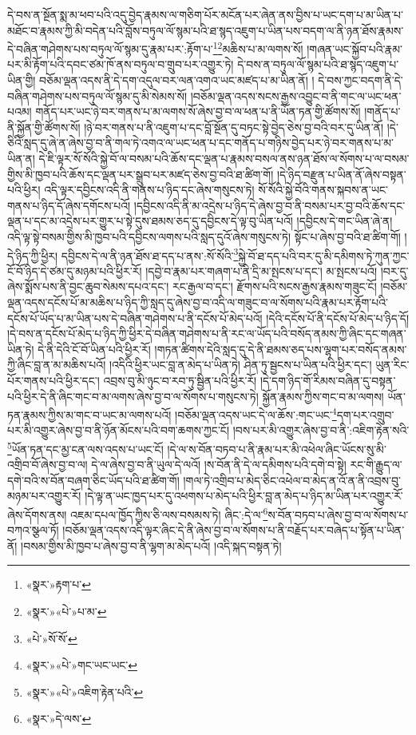དེ་བས་ན་སྔོན་སྨ་མ་ཕབ་པའི་འདུ་བྱེད་རྣམས་ལ་གཅིག་པོར་མངོན་པར་ཞེན་ནས་བྱིས་པ་ཡང་དག་པ་མ་ཡིན་པ་མཐོང་བ་རྣམས་ཀྱི་མི་བདེན་པའི་བློས་བཏུལ་ལོ་སྙམ་པའི་ཐ་སྙད་འཇུག་པ་ཡིན་པས་བདག་ལ་ནི་ཉན་ཐོས་རྣམས་དེ་བཞིན་གཤེགས་པས་བཏུལ་ལོ་སྙམ་དུ་རྣམ་པར་:རྟོག་པ་\footnote{«སྣར་»རྟག་པ་}\footnote{«སྣར་»«པེ་»པ་མ་}མཆིས་པ་མ་ལགས་སོ། །གཞན་ཡང་སྐྱོབ་པའི་རྣམ་པར་མི་རྟོག་པའི་དབང་ཙམ་ཁོ་ནས་བཏུལ་བ་གྲུབ་པར་འགྱུར་ཏེ། དེ་བས་ན་བཏུལ་ལོ་སྙམ་པའི་ཐ་སྙད་འཇུག་པ་ཡིན་གྱི། བཅོམ་ལྡན་འདས་ནི་དེ་དག་འདུལ་བར་ལན་འགའ་ཡང་མཛད་པ་མ་ཡིན་ནོ། །
དེ་བས་ཀྱང་བདག་ནི་དེ་བཞིན་གཤེགས་པས་བཏུལ་ལོ་སྙམ་དུ་མི་སེམས་སོ། །བཅོམ་ལྡན་འདས་སངས་རྒྱས་འབྱུང་བ་ནི་གང་ལ་ཡང་ཕན་པའམ། གནོད་པར་ཡང་ཉེ་བར་གནས་པ་མ་ལགས་སོ་ཞེས་བྱ་བ་ལ་ཕན་པ་ནི་ཡོན་ཏན་གྱི་ཚོགས་སོ། །གནོད་པ་ནི་སྐྱོན་གྱི་ཚོགས་སོ། །ཉེ་བར་གནས་པ་ནི་འཇུག་པ་དང་བློ་སྔོན་དུ་བཏང་སྟེ་བྱེད་ཅེས་བྱ་བའི་བར་དུ་ཡིན་ནོ། །དེ་ཅིའི་སླད་དུ་ཞེ་ན་ཞེས་བྱ་བ་ནི་གལ་ཏེ་འགའ་ལ་ཡང་ཕན་པ་དང་གནོད་པ་གཉིས་བྱེད་པར་ཉེ་བར་གནས་པ་མ་ཡིན་ན། དེ་ཇི་ལྟར་སོ་སོའི་སྐྱེ་བོ་ལ་བསམ་པའི་ཆོས་དང་ལྡན་པ་རྣམས་བསལ་ནས་ཉན་ཐོས་ལ་སོགས་པ་ལ་བསམ་གྱིས་མི་ཁྱབ་པའི་ཆོས་དང་ལྡན་པར་སྒྲུབ་པར་མཛད་ཅེས་བྱ་བའི་ཐ་ཚིག་གོ། །དེ་ཉིད་བརྫུན་པ་ཡིན་ནོ་ཞེས་བསྟན་པའི་ཕྱིར། འདི་ལྟར་དབྱིངས་འདི་ནི་གནས་པ་ཉིད་དང་ཞེས་གསུངས་ཏེ། སོ་སོའི་སྐྱེ་བོའི་གནས་སྐབས་ན་ཡང་གནས་པ་ཉིད་དོ་ཞེས་དགོངས་པའོ། །དབྱིངས་འདི་ནི་མ་འདྲེས་པ་ཉིད་དེ་ཞེས་བྱ་བ་ནི་བསམ་པར་བྱ་བའི་ཆོས་དང་ལྡན་པ་དང་མ་འདྲེས་པར་གྱུར་པ་སྟེ་དུས་ཐམས་ཅད་དུ་དབྱིངས་དེ་ལྟ་བུ་ཡིན་པའོ། །དབྱིངས་དེ་གང་ཡིན་ཞེ་ན། འདི་ལྟ་སྟེ་བསམ་གྱིས་མི་ཁྱབ་པའི་དབྱིངས་ལགས་པའི་སླད་དུའོ་ཞེས་གསུངས་ཏེ། སྟོང་པ་ཞེས་བྱ་བའི་ཐ་ཚིག་གོ། །དེ་ཉིད་ཀྱི་ཕྱིར། དབྱིངས་དེ་ལ་ནི་ཉན་ཐོས་ཐ་དད་པ་ནས་:སོ་སོའི་\footnote{«པེ་»སོ་སོ་}སྐྱེ་བོ་ཐ་དད་པའི་བར་དུ་མི་དམིགས་ཏེ་ཀུན་ཀྱང་ངོ་བོ་ཉིད་དེ་ཙམ་དུ་མཉམ་པའི་ཕྱིར་རོ། །དབྱེ་བ་རྣམ་པར་གཞག་པ་ནི་དྲི་མ་སྤངས་པ་དང་། མ་སྤངས་པའོ། །བར་དུ་ཞེས་སྨོས་པས་ནི་བྱང་ཆུབ་སེམས་དཔའ་དང་། རང་རྒྱལ་བ་དང་། རྫོགས་པའི་སངས་རྒྱས་རྣམས་གཟུང་ངོ། །བཅོམ་ལྡན་འདས་དངོས་པོ་མ་མཆིས་པ་ཉིད་ཀྱི་སླད་དུ་ཞེས་བྱ་བ་འདི་ལ་གཟུང་བ་ལ་སོགས་པའི་རྣམ་པར་རྟོག་པའི་དངོས་པོ་ཡོད་པ་མ་ཡིན་པས་དེ་བཞིན་གཤེགས་པ་ནི་དངོས་པོ་མེད་པའོ། །དེའི་དངོས་པོ་ནི་དངོས་པོ་མེད་པ་ཉིད་དོ། །དེ་བས་ན་དངོས་པོ་མེད་པ་ཉིད་ཀྱི་ཕྱིར་དེ་བཞིན་གཤེགས་པ་ནི་རང་ལ་ཡོད་པའི་བསོད་ནམས་ཀྱི་ཞིང་དང་གཞན་ཡིན་ཏེ། དེ་ནི་དེའི་ངོ་བོ་ཡིན་པའི་ཕྱིར་རོ། །གཏན་ཚིགས་དེའི་སླད་དུ་དེ་ནི་ཐམས་ཅད་པས་ལྷག་པར་བསོད་ནམས་ཀྱི་ཞིང་བླ་ན་མ་མཆིས་པའོ། །འདིའི་ཕྱིར་ཡང་བླ་ན་མེད་པ་ཡིན་ཏེ། ཤིན་ཏུ་སྦྱངས་པ་ཡིན་པའི་ཕྱིར་དང་། ཡུན་རིང་པོར་གནས་པའི་ཕྱིར་དང་། འབྲས་བུ་མི་ཉུང་བ་རབ་ཏུ་སྦྱིན་པའི་ཕྱིར་རོ། །དེ་དག་ཉིད་གོ་རིམས་བཞིན་དུ་བསྟན་པའི་ཕྱིར་དེ་ནི་ཞིང་གང་བ་མ་ལགས་ཞེས་བྱ་བ་ལ་སོགས་པ་གསུངས་ཏེ། སྐྱོན་རྣམས་ཀྱིས་གང་བ་མ་ལགས། ཡོན་ཏན་རྣམས་ཀྱིས་མ་གང་བ་ཡང་མ་ལགས་པའོ། །བཅོམ་ལྡན་འདས་ཡང་དེ་ལ་ཆོས་:གང་ཡང་\footnote{«སྣར་»«པེ་»གང་ཡང་ཡང་}དག་པར་འགྲུབ་པར་མི་འགྱུར་ཞེས་བྱ་བ་ནི་ཉོན་མོངས་པའི་བག་ཆགས་ཀྱང་ངོ། །བས་པར་མི་འགྱུར་ཞེས་བྱ་བ་ནི་:འཇིག་རྟེན་སའི་\footnote{«སྣར་»«པེ་»འཇིག་རྟེན་པའི་}ཡོན་ཏན་དང་མྱ་ངན་ལས་འདས་པ་ཡང་ངོ། །དེ་ལ་ས་བོན་བཏབ་པ་ནི་རྣམ་པར་མི་འཕེལ་ཞིང་ཡོངས་སུ་མི་འགྲིབ་བོ་ཞེས་བྱ་བ་ལ། དེ་ལ་ཞེས་བྱ་བ་ནི་ཡུལ་དེ་ལའོ། །ས་བོན་ནི་དེ་ལ་དམིགས་པའི་དགེ་བ་སྟེ། རང་གི་རྒྱུད་ལ་དགེ་བའི་ས་བོན་བཞག་ཅིང་ཡོད་པའི་ཐ་ཚིག་གོ། །གལ་ཏེ་འགྲིབ་པ་མེད་ཅིང་འཕེལ་བ་མེད་ན་འོ་ན་ནི་འབྲས་བུ་མཉམ་པར་འགྱུར་རོ། །དེ་ལྟ་ན་ཡང་ཁྱད་པར་དུ་འཕགས་པ་མེད་པའི་ཕྱིར་བླ་ན་མེད་པ་ཉིད་མ་ཡིན་པར་འགྱུར་རོ་ཞེས་དོགས་ནས། འཇམ་དཔལ་ཁྱོད་ཀྱིས་ཅི་ལས་བསམས་ཏེ། ཞིང་:དེ་ལ་\footnote{«སྣར་»དེ་ལས་}ས་བོན་བཏབ་པ་ཞེས་བྱ་བ་ལ་སོགས་པ་བཀའ་སྩལ་ཏོ། །བཅོམ་ལྡན་འདས་འདི་ལྟར་ཞིང་དེ་ནི་ཞེས་བྱ་བ་ལ་སོགས་པ་ནི་བརྗོད་པར་བཞེད་པ་སྟོན་པ་ཡིན་ནོ། །བསམ་གྱིས་མི་ཁྱབ་པ་ཞེས་བྱ་བ་ནི་ལྷག་མ་མེད་པའོ། །འདི་སྐད་བསྟན་ཏེ། 